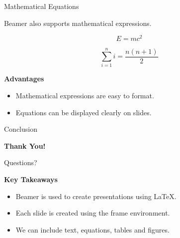 \documentclass{beamer}
\begin{document}
\begin{frame}{Mathematical Equations}

    Beamer also supports mathematical expressions.

    \[
        E = mc^2
    \]

    \[
        \sum_{i=1}^{n} i = \frac{n(n+1)}{2}
    \]

    \textbf{Advantages}
    \begin{itemize}
        \item Mathematical expressions are easy to format.
        \item Equations can be displayed clearly on slides.
    \end{itemize}

\end{frame}
\begin{frame}{Conclusion}

    \begin{center}
        \Huge \textbf{Thank You!}

        \vspace{0.5cm}

        \Large Questions?
    \end{center}

    \vspace{0.5cm}

    \textbf{Key Takeaways}

    \begin{itemize}
        \item Beamer is used to create presentations using LaTeX.
        \item Each slide is created using the frame environment.
        \item We can include text, equations, tables and figures.
    \end{itemize}

\end{frame}
\end{document}
